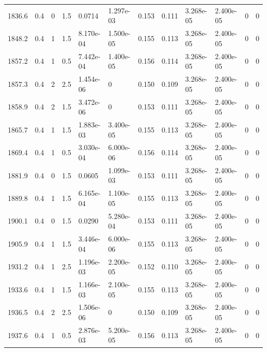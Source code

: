 \documentclass[preview]{standalone}
\begin{document}
{{{\begin{tabular}{L{1.2cm}C{1.2cm} C{0.3cm}C{0.5cm} C{1.4cm}C{1.4cm} C{1.4cm}C{1.4cm} C{1.6cm}C{1.6cm} C{1.6cm}C{1.6cm}}
  1836.6  &   0.4  & 0     & 1.5 &  0.0714  & 1.297e-03  &  0.153&   0.111& 3.268e-05 & 2.400e-05   &  0 & 0  \\ 
  1848.2  &   0.4  & 1     & 1.5 &  8.170e-04  & 1.500e-05  &  0.155&   0.113& 3.268e-05 & 2.400e-05   &  0 & 0  \\ 
  1857.2  &   0.4  & 1     & 0.5 &  7.442e-04  & 1.400e-05  &  0.156&   0.114& 3.268e-05 & 2.400e-05   &  0 & 0  \\ 
  1857.3  &   0.4  & 2     & 2.5 &  1.454e-06  & 0  &  0.150&   0.109& 3.268e-05 & 2.400e-05   &  0 & 0  \\ 
  1858.9  &   0.4  & 2     & 1.5 &  3.472e-06  & 0  &  0.153&   0.111& 3.268e-05 & 2.400e-05   &  0 & 0  \\ 
  1865.7  &   0.4  & 1     & 1.5 &  1.883e-03  & 3.400e-05  &  0.155&   0.113& 3.268e-05 & 2.400e-05   &  0 & 0  \\ 
  1869.4  &   0.4  & 1     & 0.5 &  3.030e-04  & 6.000e-06  &  0.156&   0.114& 3.268e-05 & 2.400e-05   &  0 & 0  \\ 
  1881.9  &   0.4  & 0     & 1.5 &  0.0605  & 1.099e-03  &  0.153&   0.111& 3.268e-05 & 2.400e-05   &  0 & 0  \\ 
  1889.8  &   0.4  & 1     & 1.5 &  6.165e-04  & 1.100e-05  &  0.155&   0.113& 3.268e-05 & 2.400e-05   &  0 & 0  \\ 
  1900.1  &   0.4  & 0     & 1.5 &  0.0290  & 5.280e-04  &  0.153&   0.111& 3.268e-05 & 2.400e-05   &  0 & 0  \\ 
  1905.9  &   0.4  & 1     & 1.5 &  3.446e-04  & 6.000e-06  &  0.155&   0.113& 3.268e-05 & 2.400e-05   &  0 & 0  \\ 
  1931.2  &   0.4  & 1     & 2.5 &  1.196e-03  & 2.200e-05  &  0.152&   0.110& 3.268e-05 & 2.400e-05   &  0 & 0  \\ 
  1933.6  &   0.4  & 1     & 1.5 &  1.166e-03  & 2.100e-05  &  0.155&   0.113& 3.268e-05 & 2.400e-05   &  0 & 0  \\ 
  1936.5  &   0.4  & 2     & 2.5 &  1.506e-06  & 0  &  0.150&   0.109& 3.268e-05 & 2.400e-05   &  0 & 0  \\ 
  1937.6  &   0.4  & 1     & 0.5 &  2.876e-03  & 5.200e-05  &  0.156&   0.113& 3.268e-05 & 2.400e-05   &  0 & 0  \\ 
\hline 
\end{tabular} 

}}}
\end{document}
